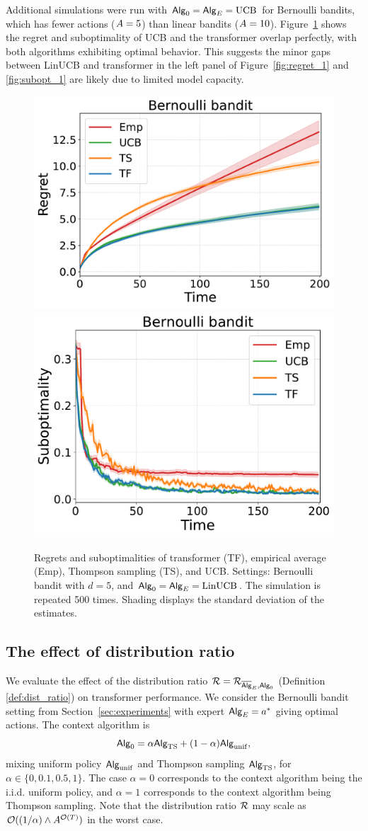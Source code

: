 Additional simulations were run with ${\mathsf{Alg}}_0={\mathsf{Alg}}_{{E}}={\mathrm{UCB}}$ for Bernoulli bandits, which has fewer actions (${A}=5$) than linear bandits (${A}=10$). Figure~\ref{fig:linucb_bernoulli} shows the regret and suboptimality of UCB and the transformer overlap perfectly, with both algorithms exhibiting optimal behavior. This suggests the minor gaps between LinUCB and transformer in the left panel of Figure~\ref{fig:regret_1} and \ref{fig:subopt_1} are likely due to limited model capacity. %

\begin{figure}[ht]
\centering  %
\includegraphics[width=0.47\linewidth]{Sections/figs/record_3_cum_True.pdf}
\includegraphics[width=0.45\linewidth]{Sections/figs/record_3_cum_False.pdf}
\caption{Regrets and suboptimalities of transformer (TF), empirical average (Emp), Thompson sampling (TS), and  UCB. Settings: Bernoulli bandit with $d=5$, and ${\mathsf{Alg}}_0={\mathsf{Alg}}_{E}={\mathrm{LinUCB}}$. 
The simulation is repeated 500 times. Shading displays the standard deviation of the estimates. } 
\label{fig:linucb_bernoulli} 
\end{figure}

\subsection{The effect of distribution ratio}

We evaluate the effect of the distribution ratio ${\mathcal{R}}={\mathcal{R}}_{\overline{\mathsf{Alg}}_{{E}},{\mathsf{Alg}}_0}$ (Definition \ref{def:dist_ratio}) on transformer performance. We consider the Bernoulli bandit setting from Section~\ref{sec:experiments} with expert ${\mathsf{Alg}}_{E}={a}^*$ giving optimal actions. The context algorithm is $${\mathsf{Alg}}_0=\alpha{\mathsf{Alg}}_{{\mathrm{TS}}}+(1-\alpha){\mathsf{Alg}}_{{\mathrm{unif}}},$$
mixing uniform policy ${\mathsf{Alg}}_{{\mathrm{unif}}}$ and Thompson sampling ${\mathsf{Alg}}_{{\mathrm{TS}}}$, for $\alpha\in\{0,0.1,0.5,1\}$. The case $\alpha=0$ corresponds to the context algorithm being the i.i.d. uniform policy, and  $\alpha=1$ corresponds to the context algorithm being Thompson sampling. Note that the distribution ratio ${\mathcal{R}}$ may scale as $\mathcal{O}((1/\alpha)\wedge {A}^{\mathcal{O}({T})})$ in the worst case. 


